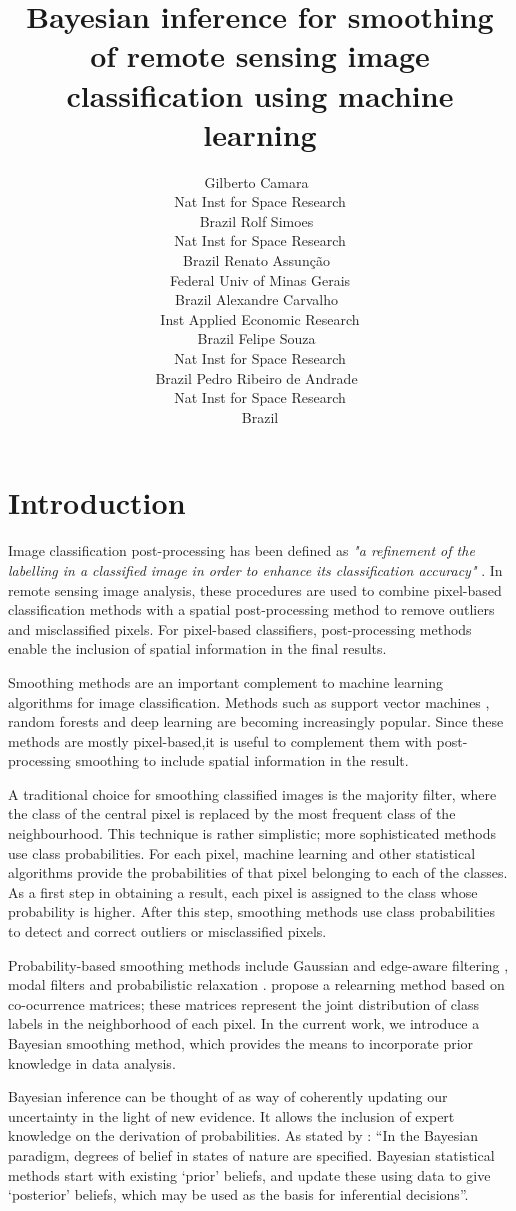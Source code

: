 \documentclass[
  shortnames]{jss}
\author{
Gilberto Camara~\orcidlink{0000-0002-3681-487X}\\Nat Inst for Space Research\\
Brazil \And Rolf Simoes~\orcidlink{0000-0003-0953-4132}\\Nat Inst for Space Research\\
Brazil \And Renato Assunção~\orcidlink{0000-0001-7442-9166}\\Federal Univ of Minas Gerais\\
Brazil \AND Alexandre Carvalho~\orcidlink{0000-0001-8762-5465}\\Inst Applied Economic Research\\
Brazil \And Felipe Souza~\orcidlink{0000-XXXXX}\\Nat Inst for Space Research\\
Brazil \And Pedro Ribeiro de Andrade~\orcidlink{0000-0001-8675-4046}\\Nat Inst for Space Research\\
Brazil
}
\title{Bayesian inference for smoothing of remote sensing image classification using machine learning}
\begin{document}
\newpage

\hypertarget{introduction}{%
\section{Introduction}\label{introduction}}

Image classification post-processing has been defined as \textit{"a refinement of the
labelling in a classified image in order to enhance its classification accuracy"}
\citep{Huang2014}. In remote sensing image analysis, these procedures are used
to combine pixel-based classification methods with a spatial post-processing
method to remove outliers and misclassified pixels. For pixel-based classifiers,
post-processing methods enable the inclusion of spatial information
in the final results.

Smoothing methods are an important complement to machine learning algorithms
for image classification. Methods such as support vector machines
\citep{Mountrakis2011}, random forests \citep{Belgiu2016} and
deep learning \citep{Ma2019} are becoming increasingly popular. Since these methods
are mostly pixel-based,it is useful to complement them with post-processing smoothing
to include spatial information in the result.

A traditional choice for smoothing classified images is the majority filter,
where the class of the central pixel is replaced by the most frequent class of
the neighbourhood. This technique is rather simplistic; more sophisticated methods
use class probabilities. For each pixel, machine learning and other statistical
algorithms provide the probabilities of that pixel belonging to each of the classes.
As a first step in obtaining a result, each pixel is assigned to the class whose
probability is higher. After this step, smoothing methods use class probabilities
to detect and correct outliers or misclassified pixels.

Probability-based smoothing methods include Gaussian and edge-aware filtering \citep{Schindler2012}, modal filters \citep{Ghimire2010} and probabilistic relaxation
\citep{Gong1989}. \citet{Huang2014} propose a relearning method based on co-ocurrence
matrices; these matrices represent the joint distribution of class labels in the
neighborhood of each pixel. In the current work, we introduce a Bayesian smoothing method,
which provides the means to incorporate prior knowledge in data analysis.

Bayesian inference can be thought of as way of coherently updating our uncertainty in the
light of new evidence. It allows the inclusion of expert knowledge on the derivation of
probabilities. As stated by \citet{Spiegelhalter2009}: ``In the Bayesian paradigm, degrees
of belief in states of nature are specified. Bayesian statistical methods start with
existing `prior' beliefs, and update these using data to give `posterior' beliefs,
which may be used as the basis for inferential decisions''.
\end{document}
